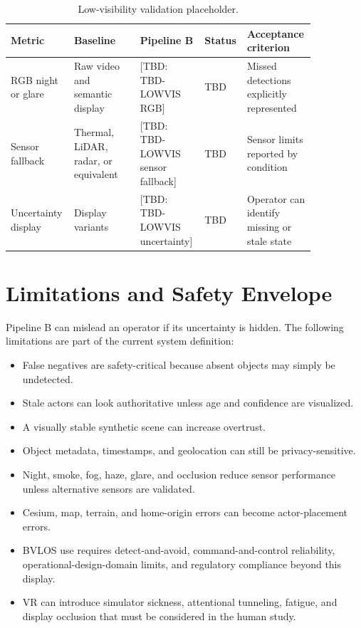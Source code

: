 \documentclass[11pt,a4paper]{article}
\newcommand{\tbd}[1]{\textcolor{publicationred}{[TBD: #1]}}
\begin{document}
\begin{table}[H]
\centering
\small
\caption{Low-visibility validation placeholder.}
\label{tab:lowvis-placeholder}
\begin{tabular}{@{}L{0.18\linewidth}L{0.21\linewidth}L{0.20\linewidth}L{0.08\linewidth}L{0.18\linewidth}@{}}
\toprule
Metric & Baseline & Pipeline B & Status & Acceptance criterion \\
\midrule
RGB night or glare & Raw video and semantic display & \tbd{TBD-LOWVIS RGB} & TBD & Missed detections explicitly represented \\
Sensor fallback & Thermal, LiDAR, radar, or equivalent & \tbd{TBD-LOWVIS sensor fallback} & TBD & Sensor limits reported by condition \\
Uncertainty display & Display variants & \tbd{TBD-LOWVIS uncertainty} & TBD & Operator can identify missing or stale state \\
\bottomrule
\end{tabular}
\normalsize
\end{table}

\section{Limitations and Safety Envelope}

Pipeline B can mislead an operator if its uncertainty is hidden. The following limitations are part of the current system definition:

\begin{itemize}
    \item False negatives are safety-critical because absent objects may simply be undetected.
    \item Stale actors can look authoritative unless age and confidence are visualized.
    \item A visually stable synthetic scene can increase overtrust.
    \item Object metadata, timestamps, and geolocation can still be privacy-sensitive.
    \item Night, smoke, fog, haze, glare, and occlusion reduce sensor performance unless alternative sensors are validated.
    \item Cesium, map, terrain, and home-origin errors can become actor-placement errors.
    \item BVLOS use requires detect-and-avoid, command-and-control reliability, operational-design-domain limits, and regulatory compliance beyond this display.
    \item VR can introduce simulator sickness, attentional tunneling, fatigue, and display occlusion that must be considered in the human study.
\end{itemize}
\end{document}
